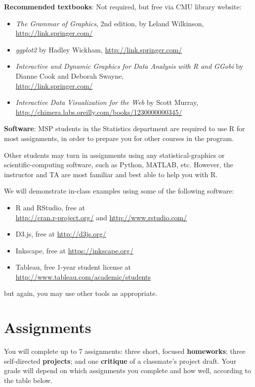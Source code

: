 \documentclass[12pt]{article}
\begin{document}
\textbf{Recommended textbooks}: Not required, but free via CMU library website:
\begin{itemize}
	\item \emph{The Grammar of Graphics}, 2nd edition, by Leland Wilkinson,\\ \url{http://link.springer.com/}
	\item \emph{ggplot2} by Hadley Wickham, \url{http://link.springer.com/}
	\item \emph{Interactive and Dynamic Graphics for Data Analysis with R and GGobi} by Dianne Cook and Deborah Swayne,\\ \url{http://link.springer.com/}
	\item \emph{Interactive Data Visualization for the Web} by Scott Murray,\\ \url{http://chimera.labs.oreilly.com/books/1230000000345/}
\end{itemize}

\textbf{Software}: MSP students in the Statistics department are required to use R for most assignments, in order to prepare you for other courses in the program.

Other students may turn in assignments using any statistical-graphics or scientific-computing software, such as Python, MATLAB, etc. However, the instructor and TA are most familiar and best able to help you with R.

\pagebreak

We will demonstrate in-class examples using some of the following software:
\begin{itemize}
	\item R and RStudio, free at\\ \url{http://cran.r-project.org/} and \url{http://www.rstudio.com/}
	\item D3.js, free at \url{http://d3js.org/}
	\item Inkscape, free at \url{https://inkscape.org/}
	\item Tableau, free 1-year student license at \url{http://www.tableau.com/academic/students}
\end{itemize}
but again, you may use other tools as appropriate.

\section*{Assignments}
You will complete up to 7 assignments: three short, focused \textbf{homeworks}; three self-directed \textbf{projects}; and one \textbf{critique} of a classmate's project draft. Your grade will depend on which assignments you complete and how well, according to the table below.
\end{document}
